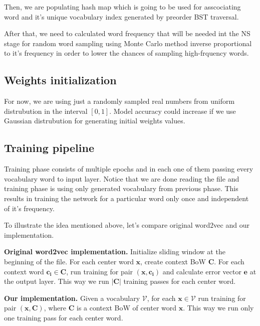 \documentclass{article}
\begin{document}
\medbreak

Then, we are populating hash map which is going to be used for asscociating
word and it's unique vocabulary index generated by preorder BST traversal.

\medbreak

After that, we need to calculated word frequency that will be needed
int the NS stage for random word sampling using Monte Carlo method inverse
proportional to it's frequency in order to lower the chances of sampling
high-frquency words.

\subsection{Weights initialization}

For now, we are using just a randomly sampled real numbers from uniform distrubution in the interval
$[0, 1]$. Model accuracy could increase if we use Gaussian distrubution for
generating initial weights values.

\subsection{Training pipeline}

Training phase consists of multiple epochs and in each one of them passing
every vocabulary word to input layer. Notice that we are done reading the file
and training phase is using only generated vocabulary from previous phase.
This results in training the network for a particular word only once and
independent of it's frequency.

\medbreak

To illustrate the idea mentioned above, let's compare original word2vec and our implementation.

\textbf{Original word2vec implementation.}
Initialize sliding window at the beginning of the file. For each center word $\boldsymbol{x}$, create context BoW $\boldsymbol{C}$. For each context word $\boldsymbol{c_i} \in \boldsymbol{C}$, run training for pair $(\boldsymbol{x}, \boldsymbol{c_i})$ and calculate error vector $\boldsymbol{e}$ at the output layer. This way we run $|\boldsymbol{C}|$ training passes for each center word.

\textbf{Our implementation.}
Given a vocabulary $\mathcal{V}$, for each $\boldsymbol{x} \in \mathcal{V}$ run training for pair $(\boldsymbol{x}, \boldsymbol{C})$, where $\boldsymbol{C}$ is a context BoW of center word $\boldsymbol{x}$. This way we run only one training pass for each center word.
\end{document}
